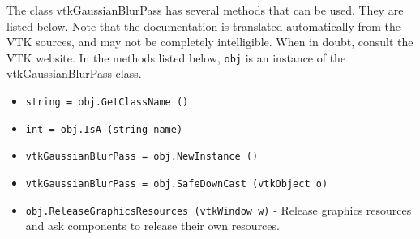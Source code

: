 The class vtkGaussianBlurPass has several methods that can be used.
  They are listed below.
Note that the documentation is translated automatically from the VTK sources,
and may not be completely intelligible.  When in doubt, consult the VTK website.
In the methods listed below, \verb|obj| is an instance of the vtkGaussianBlurPass class.
\begin{itemize}
\item  \verb|string = obj.GetClassName ()|

\item  \verb|int = obj.IsA (string name)|

\item  \verb|vtkGaussianBlurPass = obj.NewInstance ()|

\item  \verb|vtkGaussianBlurPass = obj.SafeDownCast (vtkObject o)|

\item  \verb|obj.ReleaseGraphicsResources (vtkWindow w)| -  Release graphics resources and ask components to release their own
 resources.
 

\end{itemize}

